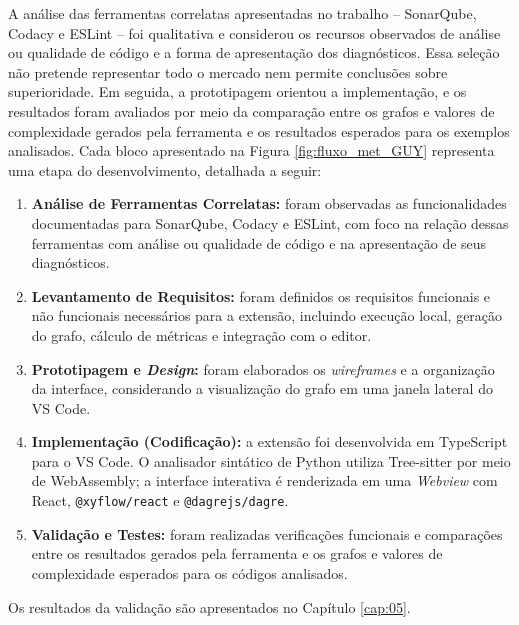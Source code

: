 A análise das ferramentas correlatas apresentadas no trabalho -- SonarQube, Codacy e ESLint -- foi qualitativa e considerou os recursos observados de análise ou qualidade de código e a forma de apresentação dos diagnósticos. Essa seleção não pretende representar todo o mercado nem permite conclusões sobre superioridade. Em seguida, a prototipagem orientou a implementação, e os resultados foram avaliados por meio da comparação entre os grafos e valores de complexidade gerados pela ferramenta e os resultados esperados para os exemplos analisados. Cada bloco apresentado na Figura \ref{fig:fluxo_met_GUY} representa uma etapa do desenvolvimento, detalhada a seguir:

\begin{enumerate}
\item \textbf{Análise de Ferramentas Correlatas:} foram observadas as funcionalidades documentadas para SonarQube, Codacy e ESLint, com foco na relação dessas ferramentas com análise ou qualidade de código e na apresentação de seus diagnósticos.
\item \textbf{Levantamento de Requisitos:} foram definidos os requisitos funcionais e não funcionais necessários para a extensão, incluindo execução local, geração do grafo, cálculo de métricas e integração com o editor.
\item \textbf{Prototipagem e \textit{Design}:} foram elaborados os \textit{wireframes} e a organização da interface, considerando a visualização do grafo em uma janela lateral do VS Code.
\item \textbf{Implementação (Codificação):} a extensão foi desenvolvida em TypeScript para o VS Code. O analisador sintático de Python utiliza Tree-sitter por meio de WebAssembly; a interface interativa é renderizada em uma \textit{Webview} com React, \texttt{@xyflow/react} e \texttt{@dagrejs/dagre}.
\item \textbf{Validação e Testes:} foram realizadas verificações funcionais e comparações entre os resultados gerados pela ferramenta e os grafos e valores de complexidade esperados para os códigos analisados.
\end{enumerate}

Os resultados da validação são apresentados no Capítulo \ref{cap:05}.
